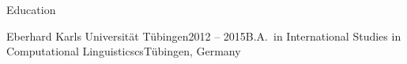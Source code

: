 \documentclass{resume} %
\begin{document}
\begin{rSection}{Education}
\begin{rSubsection}{Eberhard Karls Universität Tübingen}{2012 -- 2015}{B.A.\ in International Studies in Computational Linguisticscs}{Tübingen, Germany}
	
\end{rSubsection}

\end{rSection}

\end{document}
